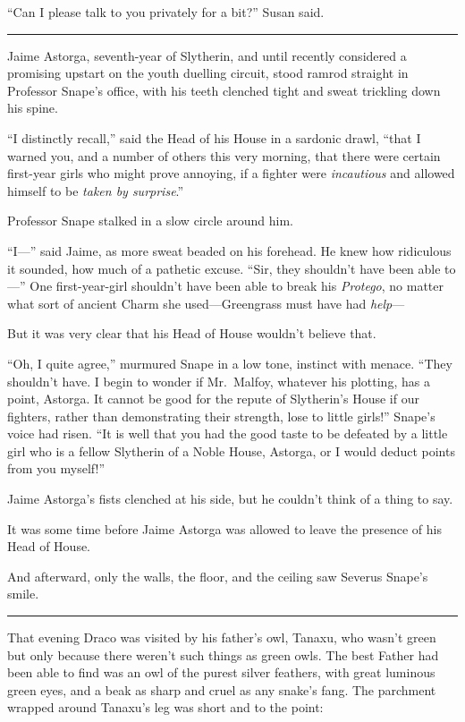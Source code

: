 ``Can I please talk to you privately for a bit?'' Susan said.

\begin{center}\rule{3in}{0.4pt}\end{center}

Jaime Astorga, seventh-year of Slytherin, and until recently considered
a promising upstart on the youth duelling circuit, stood ramrod straight
in Professor Snape's office, with his teeth clenched tight and sweat
trickling down his spine.

``I distinctly recall,'' said the Head of his House in a sardonic drawl,
``that I warned you, and a number of others this very morning, that
there were certain first-year girls who might prove annoying, if a
fighter were \emph{incautious} and allowed himself to be \emph{taken by
surprise}.''

Professor Snape stalked in a slow circle around him.

``I---'' said Jaime, as more sweat beaded on his forehead. He knew how
ridiculous it sounded, how much of a pathetic excuse. ``Sir, they
shouldn't have been able to---'' One first-year-girl shouldn't have been
able to break his \emph{Protego}, no matter what sort of ancient Charm
she used---Greengrass must have had \emph{help}---

But it was very clear that his Head of House wouldn't believe that.

``Oh, I quite agree,'' murmured Snape in a low tone, instinct with
menace. ``They shouldn't have. I begin to wonder if Mr.~Malfoy, whatever
his plotting, has a point, Astorga. It cannot be good for the repute of
Slytherin's House if our fighters, rather than demonstrating their
strength, lose to little girls!'' Snape's voice had risen. ``It is well
that you had the good taste to be defeated by a little girl who is a
fellow Slytherin of a Noble House, Astorga, or I would deduct points
from you myself!''

Jaime Astorga's fists clenched at his side, but he couldn't think of a
thing to say.

It was some time before Jaime Astorga was allowed to leave the presence
of his Head of House.

And afterward, only the walls, the floor, and the ceiling saw Severus
Snape's smile.

\begin{center}\rule{3in}{0.4pt}\end{center}

That evening Draco was visited by his father's owl, Tanaxu, who wasn't
green but only because there weren't such things as green owls. The best
Father had been able to find was an owl of the purest silver feathers,
with great luminous green eyes, and a beak as sharp and cruel as any
snake's fang. The parchment wrapped around Tanaxu's leg was short and to
the point:

